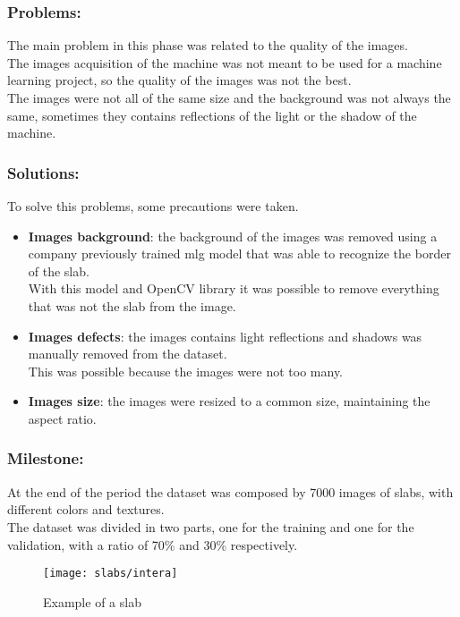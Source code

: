 \subsubsection{Problems:}
The main problem in this phase was related to the quality of the images.\\
The images acquisition of the machine was not meant to be used for a machine learning project, so the quality of the images was not the best.\\
The images were not all of the same size and the background was not always the same, sometimes they contains reflections of the light or the shadow of the machine.\\
\subsubsection{Solutions:}
To solve this problems, some precautions were taken.\\
\begin{itemize}
    \item \textbf{Images background}: the background of the images was removed using a company previously trained \gls{mlg} model that was able to recognize the border of the slab.\\
                              With this model and OpenCV library it was possible to remove everything that was not the slab from the image.
    \item \textbf{Images defects}: the images contains light reflections and shadows was manually removed from the dataset.\\
                                   This was possible because the images were not too many.
    \item \textbf{Images size}: the images were resized to a common size, maintaining the aspect ratio.\\
\end{itemize}
\subsubsection{Milestone:}
At the end of the period the dataset was composed by 7000 images of slabs, with different colors and textures.\\
The dataset was divided in two parts, one for the training and one for the validation, with a ratio of 70\% and 30\% respectively.\\
\begin{figure}
    \centering
    \texttt{[image: slabs/intera]}
    \caption{Example of a slab}
\end{figure}

